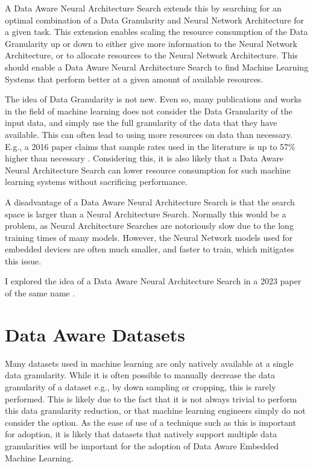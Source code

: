 \documentclass{acaces}
\begin{document}
A Data Aware Neural Architecture Search extends this by searching for an optimal combination of a Data Granularity and Neural Network Architecture for a given task.
This extension enables scaling the resource consumption of the Data Granularity up or down to either give more information to the Neural Network Architecture, or to allocate resources to the Neural Network Architecture.
This should enable a Data Aware Neural Architecture Search to find Machine Learning Systems that perform better at a given amount of available resources.

The idea of Data Granularity is not new.
Even so, many publications and works in the field of machine learning does not consider the Data Granularity of the input data, and simply use the full granularity of the data that they have available. 
This can often lead to using more resources on data than necessary. 
E.g., a 2016 paper claims that sample rates used in the literature is up to 57\% higher than necessary \cite{khan2016optimising}.
Considering this, it is also likely that a Data Aware Neural Architecture Search can lower resource consumption for such machine learning systems without sacrificing performance.

A disadvantage of a Data Aware Neural Architecture Search is that the search space is larger than a Neural Architecture Search.
Normally this would be a problem, as Neural Architecture Searches are notoriously slow due to the long training times of many models.
However, the Neural Network models used for embedded devices are often much smaller, and faster to train, which mitigates this issue.

I explored the idea of a Data Aware Neural Architecture Search in a 2023 paper of the same name \cite{njor2023data}.

\section{Data Aware Datasets}
Many datasets used in machine learning are only natively available at a single data granularity.
While it is often possible to manually decrease the data granularity of a dataset e.g., by down sampling or cropping, this is rarely performed.
This is likely due to the fact that it is not always trivial to perform this data granularity reduction, or that machine learning engineers simply do not consider the option.
As the ease of use of a technique such as this is important for adoption, it is likely that datasets that natively support multiple data granularities will be important for the adoption of Data Aware Embedded Machine Learning.
\end{document}
